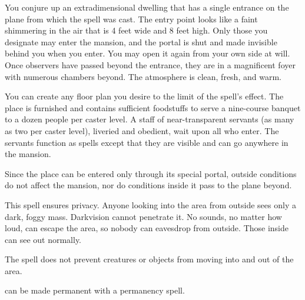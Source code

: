 \spellrng{\rngclose}
\begin{spelleffect}
You conjure up an extradimensional dwelling that has a single entrance on the plane from which the spell was cast. The entry point looks like a faint shimmering in the air that is 4 feet wide and 8 feet high. Only those you designate may enter the mansion, and the portal is shut and made invisible behind you when you enter. You may open it again from your own side at will. Once observers have passed beyond the entrance, they are in a magnificent foyer with numerous chambers beyond. The atmosphere is clean, fresh, and warm.
\par You can create any floor plan you desire to the limit of the spell's effect. The place is furnished and contains sufficient foodstuffs to serve a nine-course banquet to a dozen people per caster level. A staff of near-transparent servants (as many as two per caster level), liveried and obedient, wait upon all who enter. The servants function as  spells except that they are visible and can go anywhere in the mansion.
\par Since the place can be entered only through its special portal, outside conditions do not affect the mansion, nor do conditions inside it pass to the plane beyond.
\end{spelleffect}

\spellrng{\rngclose}
\begin{spelleffect}
This spell ensures privacy. Anyone looking into the area from outside sees only a dark, foggy mass. Darkvision cannot penetrate it. No sounds, no matter how loud, can escape the area, so nobody can eavesdrop from outside. Those inside can see out normally.
\par The spell does not prevent creatures or objects from moving into and out of the area.
\end{spelleffect}
\begin{spellnotes}
 can be made permanent with a permanency spell.
\end{spellnotes}

